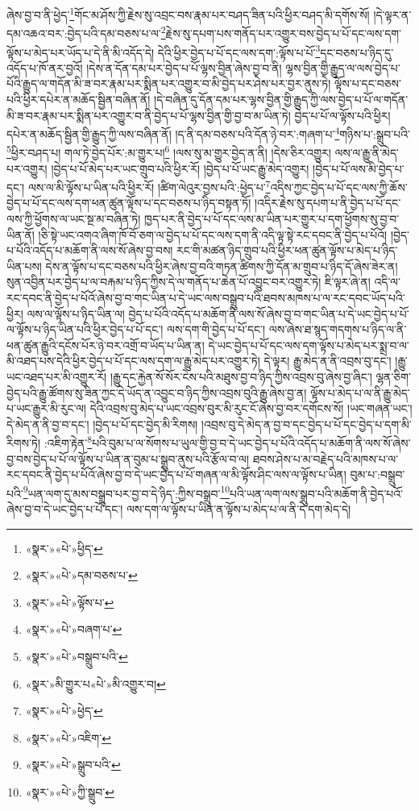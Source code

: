 ཞེས་བྱ་བ་ནི་ཕྱེད་\footnote{«སྣར་»«པེ་»ཕྱིད་}གོང་མ་ཤོས་ཀྱི་རྗེས་སུ་འབྲང་བས་རྣམ་པར་བཤད་ཟིན་པའི་ཕྱིར་བཤད་མི་དགོས་སོ། །དེ་ལྟར་ན་དམ་འཆའ་བར་:བྱེད་པའི་དམ་བཅས་པ་ལ་\footnote{«སྣར་»«པེ་»དམ་བཅས་པ་}རྗེས་སུ་དཔག་པས་གནོད་པར་འགྱུར་བས་བྱེད་པ་པོ་དང་ལས་དག་ལྟོས་པ་མེད་པར་ཡོད་པ་དེ་ནི་མི་འདོད་དེ། དེའི་ཕྱིར་བྱེད་པ་པོ་དང་ལས་དག་:ལྟོས་པ་པོ་\footnote{«སྣར་»«པེ་»ལྟོས་པ་}དང་བཅས་པ་ཉིད་དུ་འདོད་པ་ཁོ་ནར་བྱའོ། །དེས་ན་དོན་དམ་པར་བྱེད་པ་པོ་ལྷས་བྱིན་ཞེས་བྱ་བ་ནི། ལྷས་བྱིན་གྱི་རྒྱུད་ལ་ལས་བྱེད་པ་པོའི་རྒྱུད་ལ་གདོན་མི་ཟ་བར་རྣམ་པར་སྨིན་པར་འགྱུར་བ་མི་བྱེད་པར་ཤེས་པར་བྱར་ནུས་ཏེ། ལྟོས་པ་དང་བཅས་པའི་ཕྱིར་དཔེར་ན་མཆོད་སྦྱིན་བཞིན་ནོ། །དེ་བཞིན་དུ་དོན་དམ་པར་ལྷས་བྱིན་གྱི་རྒྱུད་ཀྱི་ལས་བྱེད་པ་པོ་ལ་གདོན་མི་ཟ་བར་རྣམ་པར་སྨིན་པར་འགྱུར་བ་ནི་བྱེད་པ་པོ་ལྷས་བྱིན་གྱི་བྱ་བ་མ་ཡིན་ཏེ། བྱེད་པ་པོ་ལ་ལྟོས་པའི་ཕྱིར། དཔེར་ན་མཆོད་སྦྱིན་གྱི་རྒྱུད་ཀྱི་ལས་བཞིན་ནོ། །ད་ནི་དམ་བཅས་པའི་དོན་ཉེ་བར་:གཞག་པ་\footnote{«སྣར་»«པེ་»བཞག་པ་}གཉིས་པ་:སྒྲུབ་པའི་\footnote{«སྣར་»«པེ་»བསྒྲུབ་པའི་}ཕྱིར་བཤད་པ། གལ་ཏེ་བྱེད་པོར་:མ་གྱུར་པ།\footnote{«སྣར་»མི་གྱུར་པ«པེ་»མི་འགྱུར་བ།} །ལས་སུ་མ་གྱུར་བྱེད་ན་ནི། །དེས་ཅིར་འགྱུར། ལས་ལ་རྒྱུ་ནི་མེད་པར་འགྱུར། །བྱེད་པ་པོ་མེད་པར་ཡང་གྲུབ་པའི་ཕྱིར་རོ། །བྱེད་པ་པོ་ཡང་རྒྱུ་མེད་འགྱུར། །བྱེད་པ་པོ་ལས་མི་བྱེད་པ་དང་། ལས་ལ་མི་ལྟོས་པ་ཡིན་པའི་ཕྱིར་རོ། །ཚིག་ལེའུར་བྱས་པའི་:ཕྱེད་པ་\footnote{«སྣར་»«པེ་»ཕྱེད་}འདིས་ཀྱང་བྱེད་པ་པོ་དང་ལས་ཀྱི་ཆོས་བྱེད་པ་པོ་དང་ལས་དག་ཕན་ཚུན་ལྟོས་པ་དང་བཅས་པ་ཉིད་བསྟན་ཏོ། །འདིར་རྗེས་སུ་དཔག་པ་ནི་བྱེད་པ་པོ་དང་ལས་ཀྱི་ཕྱོགས་ལ་ཡང་སྔ་མ་བཞིན་ཏེ། ཁྱད་པར་ནི་བྱེད་པ་པོ་དང་ལས་མ་ཡིན་པར་གྱུར་པ་དག་ཕྱོགས་སུ་བྱ་བ་ཡིན་ནོ། །ཅི་སྟེ་ཡང་འགའ་ཞིག་ཁོ་བོ་ཅག་ལ་བྱེད་པ་པོ་དང་ལས་དག་ནི་འདི་ལྟ་སྟེ་རང་དབང་ནི་བྱེད་པ་པོའོ། །བྱེད་པ་པོའི་འདོད་པ་མཆོག་ནི་ལས་སོ་ཞེས་བྱ་བས། རང་གི་མཚན་ཉིད་གྲུབ་པའི་ཕྱིར་ཕན་ཚུན་ལྟོས་པ་མེད་པ་ཉིད་ཡིན་པས། དེས་ན་ལྟོས་པ་དང་བཅས་པའི་ཕྱིར་ཞེས་བྱ་བའི་གཏན་ཚིགས་ཀྱི་དོན་མ་གྲུབ་པ་ཉིད་དོ་ཞེས་ཟེར་ན། སུན་འབྱིན་པར་བྱེད་པ་ལ་བརྐམ་པ་ཉིད་ཀྱིས་དེ་ལ་གནོད་པ་ཆེན་པོ་འབྱུང་བར་འགྱུར་ཏེ། ཇི་ལྟར་ཞེ་ན། འདི་ལ་རང་དབང་ནི་བྱེད་པ་པོའོ་ཞེས་བྱ་བ་གང་ཡིན་པ་དེ་ཡང་ལས་བསྒྲུབ་པའི་ཐབས་མཁས་པ་ལ་རང་དབང་ཡོད་པའི་ཕྱིར། ལས་ལ་ལྟོས་པ་ཉིད་ཡིན་ལ། བྱེད་པ་པོའི་འདོད་པ་མཆོག་ནི་ལས་སོ་ཞེས་བྱ་བ་གང་ཡིན་པ་དེ་ཡང་བྱེད་པ་པོ་ལ་ལྟོས་པ་ཉིད་ཡིན་པའི་ཕྱིར་བྱེད་པ་པོ་དང་། ལས་དག་གི་བྱེད་པ་པོ་དང་། ལས་ཞེས་ཐ་སྙད་གདགས་པ་ཉིད་ལ་ནི་ཕན་ཚུན་རྒྱུའི་དངོས་པོར་ཉེ་བར་འགྲོ་བ་ཡོད་པ་ཡིན་ན། དེ་ཡང་བྱེད་པ་པོ་དང་ལས་དག་ལྟོས་པ་མེད་པར་སྨྲ་བ་ལ་མི་འཐད་པས་དེའི་ཕྱིར་བྱེད་པ་པོ་དང་ལས་དག་ལ་རྒྱུ་མེད་པར་འགྱུར་ཏེ། དེ་ལྟར། རྒྱུ་མེད་ན་ནི་འབྲས་བུ་དང་། །རྒྱུ་ཡང་འཐད་པར་མི་འགྱུར་རོ། །རྒྱུ་དང་རྐྱེན་སོ་སོར་ངེས་པའི་མཐུས་བྱ་བ་ཉིད་ཀྱིས་འབྲས་བུ་ཞེས་བྱ་ཞིང་། ལྷན་ཅིག་བྱེད་པའི་རྒྱུ་ཚོགས་སུ་ཟིན་ཀྱང་དེ་ཡོད་ན་འབྱུང་བ་ཉིད་ཀྱིས་འབྲས་བུའི་རྒྱུ་ཞེས་བྱ་ན། ལྟོས་པ་མེད་པ་ལ་ནི་རྒྱུ་མེད་པ་ཡང་རྒྱུར་མི་རུང་ལ། དེའི་འབྲས་བུ་མེད་པ་ཡང་འབྲས་བུར་མི་རུང་ངོ་ཞེས་བྱ་བར་དགོངས་སོ། །ཡང་གཞན་ཡང་། དེ་མེད་ན་ནི་བྱ་བ་དང་། །བྱེད་པ་པོ་དང་བྱེད་མི་རིགས། །འབྲས་བུ་དེ་མེད་ན་བྱ་བ་དང་བྱེད་པ་པོ་དང་བྱེད་པ་དག་མི་རིགས་ཏེ། :འཇིག་རྟེན་\footnote{«སྣར་»«པེ་»འཇིག་}པའི་བུམ་པ་ལ་སོགས་པ་ཡུལ་གྱི་བྱ་བ་དེ་ཡང་བྱེད་པ་པོའི་འདོད་པ་མཆོག་ནི་ལས་སོ་ཞེས་བྱ་བས་བྱེད་པ་པོ་ལ་ལྟོས་པ་ཡིན་ན་བུམ་པ་སྒྲུབ་ནུས་པའི་རྩོལ་བ་ལ། ཐབས་ཤེས་པ་མ་བརྗེད་པའི་མཁས་པ་ལ་རང་དབང་ནི་བྱེད་པ་པོའོ་ཞེས་བྱ་བ་དེ་ཡང་བྱེད་པ་པོ་གཞན་ལ་མི་ལྟོས་ཤིང་ལས་ལ་ལྟོས་པ་ཡིན། བུམ་པ་:བསྒྲུབ་པའི་\footnote{«སྣར་»«པེ་»སྒྲུབ་པའི་}ཡན་ལག་དུ་མས་བསྒྲུབ་པར་བྱ་བ་དེ་ཉིད་:ཀྱིས་བསྒྲུབ་\footnote{«སྣར་»«པེ་»ཀྱི་སྒྲུབ་}པའི་ཡན་ལག་ལས་སྒྲུབ་པའི་མཆོག་ནི་བྱེད་པའོ་ཞེས་བྱ་བ་དེ་ཡང་བྱེད་པ་པོ་དང་། ལས་དག་ལ་ལྟོས་པ་ཡིན་ན་ལྟོས་པ་མེད་པ་ལ་ནི་དེ་དག་མེད་དེ། 